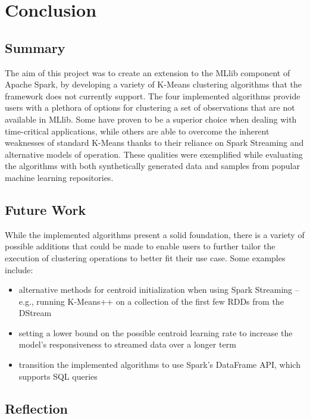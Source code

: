 \documentclass{l4proj}
\begin{document}
\chapter{Conclusion}
\label{conclusion}

\section{Summary}

The aim of this project was to create an extension to the MLlib component of Apache Spark, by developing a variety of K-Means clustering algorithms that the framework does not currently support. The four implemented algorithms provide users with a plethora of options for clustering a set of observations that are not available in MLlib. Some have proven to be a superior choice when dealing with time-critical applications, while others are able to overcome the inherent weaknesses of standard K-Means thanks to their reliance on Spark Streaming and alternative models of operation. These qualities were exemplified while evaluating the algorithms with both synthetically generated data and samples from popular machine learning repositories.

\section{Future Work}

While the implemented algorithms present a solid foundation, there is a variety of possible additions that could be made to enable users to further tailor the execution of clustering operations to better fit their use case. Some examples include:

\begin{itemize}
\item alternative methods for centroid initialization when using Spark Streaming -- e.g., running K-Means++ on a collection of the first few RDDs from the DStream
\item setting a lower bound on the possible centroid learning rate to increase the model's responsiveness to streamed data over a longer term
\item transition the implemented algorithms to use Spark's DataFrame API, which supports SQL queries
\end{itemize}

\section{Reflection}
\end{document}
